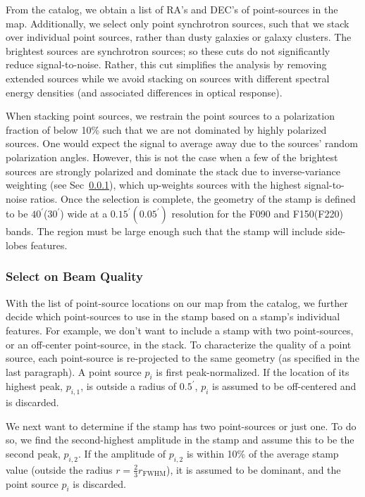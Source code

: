 From the catalog, we obtain a list of RA's and DEC's of point-sources in the map.  Additionally, we select only point synchrotron sources, such that we stack over individual point sources, rather than dusty galaxies or galaxy clusters.  The brightest sources are synchrotron sources; so these cuts do not significantly reduce signal-to-noise.  Rather, this cut simplifies the analysis by removing extended sources while we avoid stacking on sources with different spectral energy densities (and associated differences in optical response).

When stacking point sources, we restrain the point sources to a polarization fraction of below 10\% such that we are not dominated by highly polarized sources.  One would expect the signal to average away due to the sources’ random polarization angles.  However, this is not the case when a few of the brightest sources are strongly polarized and dominate the stack due to inverse-variance weighting (see Sec~\ref{subsubsec:beamqual_sel}), which up-weights sources with the highest signal-to-noise ratios.  Once the selection is complete, the geometry of the stamp is defined to be $40^{\prime}$($30^{\prime}$) wide at a $0.15^{\prime}(0.05^{\prime})$ resolution for the F090 and F150(F220) bands.  The region must be large enough such that the stamp will include side-lobes features.

\subsubsection{Select on Beam Quality}
\label{subsubsec:beamqual_sel}
With the list of point-source locations on our map from the catalog, we further decide which point-sources to use in the stamp based on a stamp's individual features.  For example, we don't want to include a stamp with two point-sources, or an off-center point-source, in the stack.  To characterize the quality of a point source, each point-source is re-projected to the same geometry (as specified in the last paragraph).  A point source $p_i$ is first peak-normalized.  If the location of its highest peak, $p_{i,1}$, is outside a radius of $0.5^{\prime}$, $p_i$ is assumed to be off-centered and is discarded.  

We next want to determine if the stamp has two point-sources or just one.  To do so, we find the second-highest amplitude in the stamp and assume this to be the second peak, $p_{i,2}$.  If the amplitude of $p_{i,2}$ is within 10\% of the average stamp value (outside the radius $r=\frac{2}{3}r_{\text{FWHM}}$), it is assumed to be dominant, and the point source $p_i$ is discarded.

